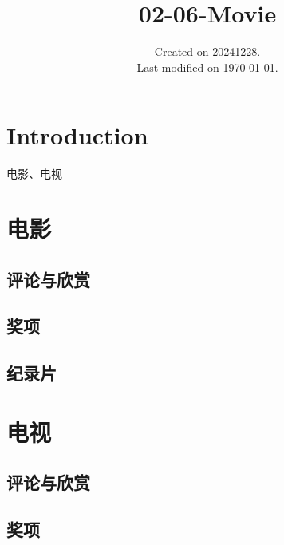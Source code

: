 \documentclass[UTF8]{../../RepresentationUniverse}
\begin{document}
\title{02-06-Movie}
\date{Created on 20241228.\\   Last modified on \today.}
\maketitle
\tableofcontents


\chapter{Introduction}



电影、电视




\chapter{电影}

\section{评论与欣赏}
\section{奖项}


\section{纪录片}






\chapter{电视}

\section{评论与欣赏}

\section{奖项}
\end{document}
